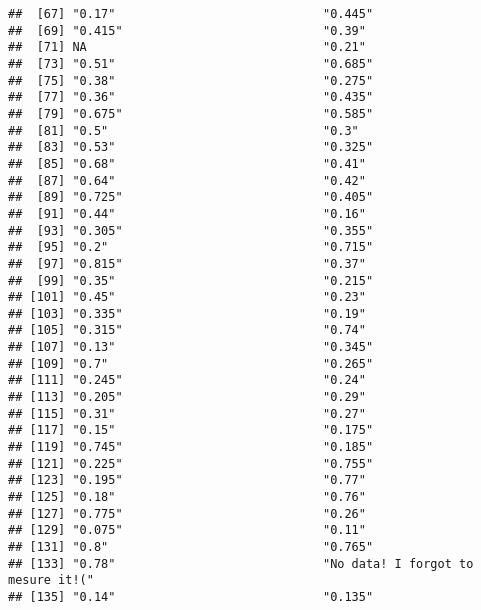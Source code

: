 \documentclass[
]{article}
\begin{document}
\begin{verbatim}
##  [67] "0.17"                             "0.445"                           
##  [69] "0.415"                            "0.39"                            
##  [71] NA                                 "0.21"                            
##  [73] "0.51"                             "0.685"                           
##  [75] "0.38"                             "0.275"                           
##  [77] "0.36"                             "0.435"                           
##  [79] "0.675"                            "0.585"                           
##  [81] "0.5"                              "0.3"                             
##  [83] "0.53"                             "0.325"                           
##  [85] "0.68"                             "0.41"                            
##  [87] "0.64"                             "0.42"                            
##  [89] "0.725"                            "0.405"                           
##  [91] "0.44"                             "0.16"                            
##  [93] "0.305"                            "0.355"                           
##  [95] "0.2"                              "0.715"                           
##  [97] "0.815"                            "0.37"                            
##  [99] "0.35"                             "0.215"                           
## [101] "0.45"                             "0.23"                            
## [103] "0.335"                            "0.19"                            
## [105] "0.315"                            "0.74"                            
## [107] "0.13"                             "0.345"                           
## [109] "0.7"                              "0.265"                           
## [111] "0.245"                            "0.24"                            
## [113] "0.205"                            "0.29"                            
## [115] "0.31"                             "0.27"                            
## [117] "0.15"                             "0.175"                           
## [119] "0.745"                            "0.185"                           
## [121] "0.225"                            "0.755"                           
## [123] "0.195"                            "0.77"                            
## [125] "0.18"                             "0.76"                            
## [127] "0.775"                            "0.26"                            
## [129] "0.075"                            "0.11"                            
## [131] "0.8"                              "0.765"                           
## [133] "0.78"                             "No data! I forgot to mesure it!("
## [135] "0.14"                             "0.135"
\end{verbatim}
\end{document}
